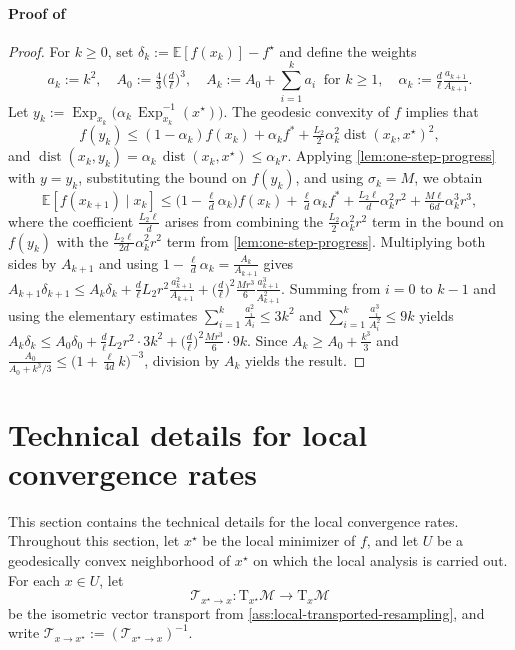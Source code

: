 \documentclass[final,onefignum,onetabnum]{siamart250211}
\begin{document}
\paragraph{Proof of }
\begin{proof}
  For $k\ge 0$, set $\delta_k:=\mathbb{E}\left[f(x_k)\right]-f^{\star}$ and define the weights
\[
a_k:=k^{2},\quad A_0:=\tfrac{4}{3}\Big(\tfrac{d}{\ell}\Big)^{3},\quad A_k:=A_0+\sum_{i=1}^{k}a_i\ \text{ for }k\ge 1,\quad \alpha_k:=\tfrac{d}{\ell}\tfrac{a_{k+1}}{A_{k+1}}.
\]
Let $y_k:=\operatorname{Exp}_{x_k}\big(\alpha_k\,\operatorname{Exp}_{x_k}^{-1}(x^\star)\big)$. 
    The geodesic convexity of $f$ implies that
    \[
    f(y_k)\le (1-\alpha_k)f(x_k)+\alpha_k f^*+\tfrac{L_2}{2}\alpha_k^{2}\operatorname{dist}(x_k,x^\star)^{2},
    \]
    and $\operatorname{dist}(x_k,y_k)=\alpha_k\,\operatorname{dist}(x_k,x^\star)\le \alpha_k r$. Applying \cref{lem:one-step-progress} with $y=y_k$, substituting the bound on $f(y_k)$, and using $\sigma_k=M$, we obtain
    \[
      \mathbb{E}\left[f(x_{k+1}) \mid x_k\right]\le \Big(1-\tfrac{\ell}{d}\alpha_k\Big)f(x_k)+\tfrac{\ell}{d}\alpha_k f^*+\tfrac{L_2 \ell}{d} \alpha_k^{2}r^{2}+\tfrac{M \ell}{6d}\alpha_k^{3}r^{3},
    \]
    where the coefficient $\tfrac{L_2\ell}{d}$ arises from combining the $\tfrac{L_2}{2}\alpha_k^{2}r^{2}$ term in the bound on $f(y_k)$ with the $\tfrac{L_2\ell}{2d}\alpha_k^{2}r^{2}$ term from \cref{lem:one-step-progress}.
    Multiplying both sides by $A_{k+1}$ and using $1-\tfrac{\ell}{d}\alpha_k=\tfrac{A_k}{A_{k+1}}$ gives
    $
    A_{k+1}\delta_{k+1}\le A_k\delta_k+\tfrac{d}{\ell}L_2 r^{2}\frac{a_{k+1}^{2}}{A_{k+1}}+\Big(\tfrac{d}{\ell}\Big)^{2}\tfrac{M r^{3}}{6}\frac{a_{k+1}^{3}}{A_{k+1}^{2}}
    $.
    Summing from $i=0$ to $k-1$ and using the elementary estimates $\sum_{i=1}^{k}\tfrac{a_i^{2}}{A_i}\le 3k^{2}$ and $\sum_{i=1}^{k}\tfrac{a_i^{3}}{A_i^{2}}\le 9k$ yields
    $
    A_k\delta_k\le A_0\delta_0+\tfrac{d}{\ell}L_2 r^{2}\cdot 3k^{2}+\Big(\tfrac{d}{\ell}\Big)^{2}\tfrac{M r^{3}}{6}\cdot 9k.
    $
    Since $A_k\ge A_0+\tfrac{k^{3}}{3}$ and $\tfrac{A_0}{A_0+k^{3}/3}\le \big(1+\tfrac{\ell}{4d}k\big)^{-3}$, division by $A_k$ yields the result.
    \end{proof}
    
  





\section{Technical details for local convergence rates}
\label{app:local-convergence-rates}
This section contains the technical details for the local convergence rates.
Throughout this section, let $x^\star$ be the local minimizer of $f$, and let $U$ be a geodesically convex neighborhood of $x^\star$ on which the local analysis is carried out. For each $x\in U$, let
\[
\mathcal T_{x^\star\to x}:\mathrm{T}_{x^\star}\mathcal{M}\to \mathrm{T}_x\mathcal{M}
\]
be the isometric vector transport from \cref{ass:local-transported-resampling}, and write $\mathcal T_{x\to x^\star}:=(\mathcal T_{x^\star\to x})^{-1}$.
\end{document}
